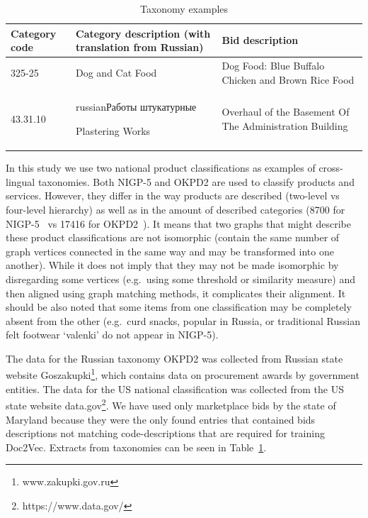 \documentclass[11pt,a4paper]{article}
\begin{document}
\begin{center}
	\begin{table}[!htbp]
		\small
		\caption{Taxonomy examples}
		\label{table-taxonomies}
                \centering
                \begin{tabular}{|p{1cm}|p{2.5cm}|p{2.5cm}|}
                        \hline
                        Category code & Category description \newline (with translation from Russian) & Bid description\\
                        \hline
                        325-25 & Dog and Cat Food & Dog Food: Blue Buffalo Chicken and Brown Rice Food\\
                        \hline
                        43.31.10 & \begin{otherlanguage*}{russian}Работы штукатурные\end{otherlanguage*} \newline Plastering Works & Overhaul of the Basement Of The Administration Building\\
                        \hline
                \end{tabular}
        \end{table}
\end{center}

In this study we use two national product classifications as examples of cross-lingual taxonomies.
Both NIGP-5 and OKPD2 are used to classify products and services. However, they differ in the way products are described (two-level vs four-level hierarchy) as well as in the amount of described categories (8700 for NIGP-5~\cite{wiki-nigp} vs 17416 for OKPD2~\cite{wiki-okpd}). It means that two graphs that might describe these product classifications are not isomorphic (contain the same number of graph vertices connected in the same way and may be transformed into one another).  While it does not imply that they may not be made isomorphic by disregarding some vertices (e.g.\ using some threshold or similarity measure) and then aligned using graph matching methods, it complicates their alignment. It should be also noted that some items from one classification may be completely absent from the other (e.g.\ curd snacks, popular in Russia, or traditional Russian felt footwear `valenki' do not appear in NIGP-5).

The data for the Russian taxonomy OKPD2 was collected from Russian state website Goszakupki\footnote{www.zakupki.gov.ru}, which contains data on procurement awards by government entities.
The data for the US national classification was collected from the US state website data.gov\footnote{https://www.data.gov/}. We have used only marketplace bids by the state of Maryland because they were the only found entries that contained bids descriptions not matching code-descriptions that are required for training Doc2Vec. Extracts from taxonomies can be seen in Table~\ref{table-taxonomies}.
\end{document}

